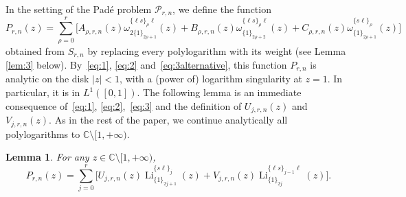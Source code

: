 \documentclass[reqno,12pt]{amsart}
\numberwithin{equation}{section}
\newtheorem{lem}{Lemma}
\theoremstyle{remark}
\def\om{\omega}
\def\li{\operatorname{Li}}
\newcommand{\C}{\mathbb{C}}
\begin{document}
In the setting of the Pad\'e problem $\mathcal{P}_{r,n}$, we define the function
$$
P_{r,n}(z) = \sum_{\rho=0}^r \bigg[ A_{\rho,r,n}(z) \om_{2\{1\}_{2\rho+1}}^{\{\ell s\}_\rho\ell}(z) 
+ B_{\rho,r,n}(z) \om_{\{1\}_{2\rho+2}}^{\{\ell s\}_\rho\ell}(z)+C_{\rho,r,n}(z)
\om_{\{1\}_{2\rho+1}}^{\{s\ell\}_\rho}(z)\bigg]
$$
obtained from $S_{r,n}$ by replacing every polylogarithm with its weight (see Lemma \ref{lem:3} below).
By~\eqref{eq:1}, \eqref{eq:2} and~\eqref{eq:3alternative}, this function $P_{r,n}$
is analytic on the disk $\vert z\vert<1$, with a (power of) logarithm singularity at $z=1$. In particular, 
it is in $L^1([0,1])$. The following lemma is an immediate consequence 
of~\eqref{eq:1}, \eqref{eq:2},~\eqref{eq:3} and   the definition of $U_{j,r,n}(z)$ and $V_{j,r,n}(z)$. 
As in the rest of the paper, we continue analytically all polylogarithms to $\C\setminus [1,+\infty)$.

\begin{lem}\label{lem:2} 
For any $z\in \mathbb C \setminus  [1,+\infty)$, 
$$
P_{r,n}(z)=\sum_{j=0}^r \bigg[U_{j,r,n}(z)\li_{\{1\}_{2j+1}}^{\{s\ell\}_j}(z) 
+ V_{j,r,n}(z)\li_{\{1\}_{2j}}^{\{\ell s\}_{j-1}\ell}(z)\bigg].
$$
\end{lem}
\end{document}

